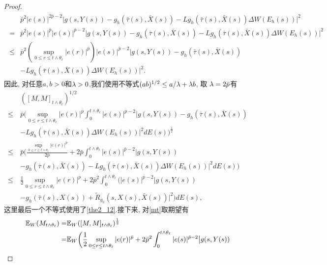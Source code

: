 \begin{proof}
\begin{align*}
    \begin{split}
        &\bar{p}^2|e(s)|^{2\bar{p}-2}\big|g(s,Y(s))-g_{h}(\bar{\tau}(s),\bar{X}(s))-Lg_{h}(\bar{\tau}(s),\bar{X}(s))\Delta W(E_h(s))\big|^2\\
        =&\bar{p}^2|e(s)|^{\bar{p}}|e(s)|^{\bar{p}-2}\big|g(s,Y(s))-g_{h}(\bar{\tau}(s),\bar{X}(s))-Lg_{h}(\bar{\tau}(s),\bar{X}(s))\Delta W(E_h(s))\big|^2\\
        \leq& \bar{p}^2(\sup_{0\leq r\leq t\wedge\theta_{\ell}}|e(r)|^{\bar{p}})|e(s)|^{\bar{p}-2}\big|g(s,Y(s))-g_{h}(\bar{\tau}(s),\bar{X}(s))\\
        &-Lg_{h}(\bar{\tau}(s),\bar{X}(s))\Delta W(E_h(s))\big|^2.
    \end{split}
\end{align*}
因此, 对任意$a,b>0$和$\lambda>0$,我们使用不等式$(ab)^{1/2}\leq a/\lambda+\lambda b$, 取 $\lambda=2\bar{p}$有
\begin{align}
    \label{mt}
    &([M,M]_{t\wedge \theta_{\ell}})^{1/2}\nonumber\\
    \leq &\bar{p}\bigg(\sup_{0\leq r\leq t\wedge\theta_{\ell}}|e(r)|^{\bar{p}}\int^{t\wedge\theta_{\ell}}_{0}|e(s)|^{\bar{p}-2}\big|g(s,Y(s))-g_{h}(\bar{\tau}(s),\bar{X}(s))\nonumber\\
    \quad&
    -Lg_{h}(\bar{\tau}(s),\bar{X}(s))\Delta W(E_h(s))\big|^2dE(s)\bigg)^{\frac{1}{2}}\nonumber\\
    \leq & \bar{p}\bigg(\frac{\sup_{0\leq r\leq t\wedge\theta_{\ell}}|e(r)|^{\bar{p}}}{2\bar{p}}+2\bar{p}\int^{t\wedge\theta_{\ell}}_{0}|e(s)|^{\bar{p}-2}\big|g(s,Y(s))\nonumber\\
    \quad&
    -g_{h}(\bar{\tau}(s),\bar{X}(s))-Lg_{h}(\bar{\tau}(s),\bar{X}(s))\Delta W(E_h(s))\big|^2dE(s)\bigg)\nonumber\\
    \leq &\frac{1}{2}\sup_{0\leq r\leq t\wedge\theta_{\ell}}|e(r)|^{\bar{p}}+2\bar{p}^{2}\int^{t\wedge\theta_{\ell}}_{0}\bigg(|e(s)|^{\bar{p}-2}\big|g(s,Y(s))\nonumber\\
    \quad&
    -g_{h}(\bar{\tau}(s),{X}(s))+\tilde{R}_{g_h}(s,X(s),\bar{X}(s))\big|^2\bigg)dE(s),
\end{align}
这里最后一个不等式使用了\eqref{the2_12}.接下来, 对\eqref{mt}取期望有
\begin{align}
    \EE_W(M_{t\wedge \theta_{\ell}})=&\EE_W([M,M]_{t\wedge \theta_{\ell}})^{\frac{1}{2}}\nonumber\\
    =&\EE_W\bigg(\frac{1}{2}\sup_{0\leq r\leq t\wedge\theta_{\ell}}|e(r)|^{\bar{p}}+2\bar{p}^{2}\int^{t\wedge\theta_{\ell}}_{0}|e(s)|^{\bar{p}-2}\big|g(s,Y(s))\nonumber\\

\end{align}
\end{proof}
